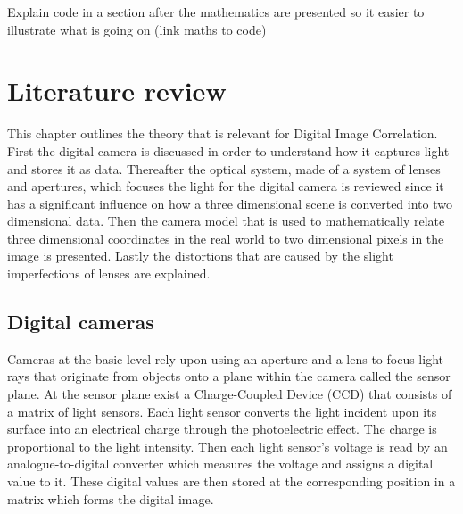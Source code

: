 \documentclass[12pt,oneside,openany,a4paper, %
english, %
masters-t, goldenblock]{usthesis}
\begin{document}
Explain code in a section after the mathematics are presented so it easier to illustrate what is going on (link maths to code)

\chapter{Literature review}
This chapter outlines the theory that is relevant for Digital Image Correlation. First the digital camera is discussed in order to understand how it captures light and stores it as data. Thereafter the optical system, made of a system of lenses and apertures, which focuses the light for the digital camera is reviewed since it has a significant influence on how a three dimensional scene is converted into two dimensional data. Then the camera model that is used to mathematically relate three dimensional coordinates in the real world to two dimensional pixels in the image is presented. Lastly the distortions that are caused by the slight imperfections of lenses are explained. 

\section{Digital cameras}
Cameras at the basic level rely upon using an aperture and a lens to focus light rays that originate from objects onto a plane within the camera called the sensor plane. At the sensor plane exist a Charge-Coupled Device (CCD) that consists of a matrix of light sensors. Each light sensor converts the light incident upon its surface into an electrical charge through the photoelectric effect. The charge is proportional to the light intensity. Then each light sensor's voltage is read by an analogue-to-digital converter which measures the voltage and assigns a digital value to it. These digital values are then stored at the corresponding position in a matrix which forms the digital image.



\end{document}
